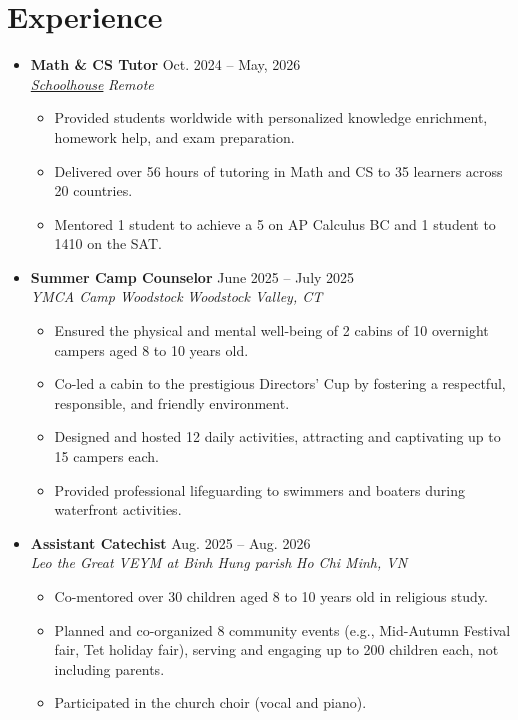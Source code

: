 \documentclass[letterpaper, 12pt]{article}
\newenvironment{ListHeading}{
    \begin{itemize}[
        leftmargin=0.1in, label={},
        itemsep=0.4em, parsep=0pt
    ]
}{ \end{itemize} }
\newenvironment{ListContent}{
    \begin{itemize}[
        leftmargin=0.2in, label=\textbullet,
        itemsep=0.15em, parsep=0pt, topsep=0.15em
    ]
}{ \end{itemize} }
\newcommand{\listItemHeadingExperience}[4]{
    \item
    \textbf{#1} \hspace{3em}\hfill #2 \\
    \textit{#3} \hspace{3em}\hfill \textit{#4}
}
\newcommand{\listItemContent}[1]{
    \item \small{#1}
}
\begin{document}
\section{Experience}
    \begin{ListHeading}
        \listItemHeadingExperience
            {Math \& CS Tutor}{Oct. 2024 -- May, 2026}
            {\href{https://schoolhouse.world/u/techmoocher}{Schoolhouse}}{Remote}
            \begin{ListContent}
                \listItemContent
                    {Provided students worldwide with personalized knowledge enrichment, homework help, and exam preparation.}
                \listItemContent
                    {Delivered over 56 hours of tutoring in Math and CS to 35 learners across 20 countries.}
                \listItemContent
                    {Mentored 1 student to achieve a 5 on AP Calculus BC and 1 student to 1410 on the SAT.}
            \end{ListContent}
        \listItemHeadingExperience
            {Summer Camp Counselor}{June 2025 -- July 2025}
            {YMCA Camp Woodstock}{Woodstock Valley, CT}
            \begin{ListContent}
                \listItemContent
                    {Ensured the physical and mental well-being of 2 cabins of 10 overnight campers aged 8 to 10 years old.}
                \listItemContent
                    {Co-led a cabin to the prestigious Directors' Cup by fostering a respectful, responsible, and friendly environment.}
                \listItemContent
                    {Designed and hosted 12 daily activities, attracting and captivating up to 15 campers each.}
                \listItemContent
                    {Provided professional lifeguarding to swimmers and boaters during waterfront activities.}
            \end{ListContent}
        \listItemHeadingExperience
            {Assistant Catechist}{Aug. 2025 -- Aug. 2026}
            {Leo the Great VEYM at Binh Hung parish}{Ho Chi Minh, VN}
            \begin{ListContent}
                \listItemContent
                    {Co-mentored over 30 children aged 8 to 10 years old in religious study.}
                \listItemContent
                    {Planned and co-organized 8 community events (e.g., Mid-Autumn Festival fair, Tet holiday fair), serving and engaging up to 200 children each, not including parents.}
                \listItemContent
                    {Participated in the church choir (vocal and piano).}
            \end{ListContent}
    \end{ListHeading}
\end{document}
